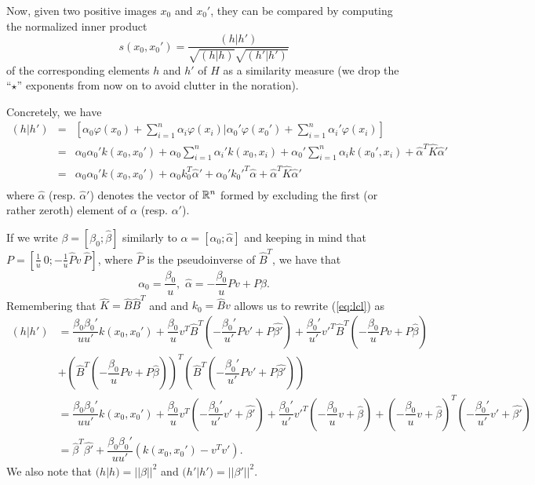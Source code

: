 \documentclass[12pt,letterpaper]{article}
\begin{document}
Now, given two positive images $x_0$ and $x_0'$, they can be compared
by computing the normalized inner product
\begin{equation}
s(x_0,x_0')=\frac{(h|h')}{\sqrt{(h|h)}\sqrt{(h'|h')}}
\end{equation}
of the corresponding elements $h$ and $h'$ of $H$ as a similarity measure
(we drop the ``$\star$'' exponents from now on to avoid clutter in the
noration).
 
Concretely, we have
\begin{equation}
\begin{array}{lcl}
(h|h')&=&\displaystyle[\alpha_0\varphi(x_0)+\sum_{i=1}^n\alpha_i\varphi(x_i)
|\alpha_0'\varphi(x_0')+\sum_{i=1}^n\alpha_i'\varphi(x_i)]\\
&=&\displaystyle
\alpha_0\alpha_0'\displaystyle k(x_0,x_0')+ \alpha_0\sum_{i=1}^n\alpha_i' k(x_0,x_i)
+\alpha_0'\sum_{i=1}^n
\alpha_ik(x_0',x_i)+\hat{\alpha}^T\hat{K}\hat{\alpha}'\\
&=&\displaystyle\alpha_0\alpha_0'\displaystyle k(x_0,x_0')+ \alpha_0k_0^T\hat{\alpha}'
+\alpha_0'k_0'^T\hat{\alpha}
+\hat{\alpha}^T\hat{K}\hat{\alpha}'\\
\end{array}
\label{eq:lcl}
\end{equation}
where $\hat{\alpha}$ (resp. $\hat{\alpha}'$) denotes the vector of
$\mathbb{R}^n$ formed by excluding the first (or rather zeroth) element
of $\alpha$ (resp. $\alpha'$).
 
 
 
If we write $\beta = [\beta_0; \hat{\beta}]$ similarly to
$\alpha=[\alpha_0; \hat{\alpha}]$ and keeping in mind that
$P=[\frac{1}{u}\ 0; -\frac{1}{u}\hat{P}v \ \hat{P}]$, where $\hat{P}$
is the pseudoinverse of
$\hat{B}^T$, we have that
\begin{equation}
\alpha_0 = \dfrac{\beta_0}{u}, \,\, \hat{\alpha}=-\dfrac{\beta_0}{u}Pv+P\hat{\beta}.
\end{equation}
Remembering that $\hat{K}=\hat{B}\hat{B}^T$ and and $k_0=\hat{B}v$
allows us to rewrite (\ref{eq:lcl}) as
\begin{align}
(h|h')& = \dfrac{\beta_0\beta_0'}{uu'}k(x_0,x_0')
+\dfrac{\beta_0}{u}v^T\hat{B}^T\left(-\dfrac{\beta_0'}{u'}Pv'+P\hat{\beta'}\right)
+\dfrac{\beta_0'}{u'}v'^T\hat{B}^T\left(-\dfrac{\beta_0}{u}Pv+P\hat{\beta}\right)\\ &+\left(\hat{B}^T\left(-\dfrac{\beta_0}{u}Pv+P\hat{\beta}\right)\right)^T
\left(\hat{B}^T\left(-\dfrac{\beta_0'}{u'}Pv'+P\hat{\beta'}\right)\right)\\ &=
\dfrac{\beta_0\beta_0'}{uu'}k(x_0,x_0')
+\dfrac{\beta_0}{u}v^T\left(-\dfrac{\beta_0'}{u'}v'+\hat{\beta'}\right)
+\dfrac{\beta_0'}{u'}v'^T\left(-\dfrac{\beta_0}{u}v+\hat{\beta}\right)
+
\left(-\dfrac{\beta_0}{u}v+\hat{\beta}\right)^T\left(-\dfrac{\beta_0'}{u'}v'+\hat{\beta'}\right)\\ &=
\hat{\beta}^T\hat{\beta'}
+\dfrac{\beta_0\beta_0'}{uu'}\left(k(x_0,x_0')-v^Tv'\right).
\end{align}
We also note that $(h|h)=||\beta||^2$ and $(h'|h')=||\beta'||^2$.
\end{document}
